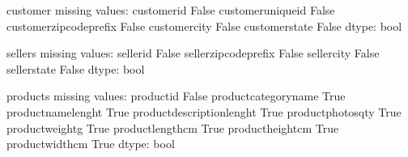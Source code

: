 \documentclass[letterpaper,10pt,english]{jupyterBook}
\begin{document}
\begin{sphinxVerbatim}[commandchars=\\\{\}]
customer missing values: 
customer\PYGZus{}id                 False
customer\PYGZus{}unique\PYGZus{}id          False
customer\PYGZus{}zip\PYGZus{}code\PYGZus{}prefix    False
customer\PYGZus{}city               False
customer\PYGZus{}state              False
dtype: bool
\end{sphinxVerbatim}

\begin{sphinxVerbatim}[commandchars=\\\{\}]
\end{sphinxVerbatim}

\begin{sphinxVerbatim}[commandchars=\\\{\}]
sellers missing values: 
seller\PYGZus{}id                 False
seller\PYGZus{}zip\PYGZus{}code\PYGZus{}prefix    False
seller\PYGZus{}city               False
seller\PYGZus{}state              False
dtype: bool
\end{sphinxVerbatim}

\begin{sphinxVerbatim}[commandchars=\\\{\}]
\end{sphinxVerbatim}

\begin{sphinxVerbatim}[commandchars=\\\{\}]
products missing values: 
product\PYGZus{}id                    False
product\PYGZus{}category\PYGZus{}name          True
product\PYGZus{}name\PYGZus{}lenght            True
product\PYGZus{}description\PYGZus{}lenght     True
product\PYGZus{}photos\PYGZus{}qty             True
product\PYGZus{}weight\PYGZus{}g               True
product\PYGZus{}length\PYGZus{}cm              True
product\PYGZus{}height\PYGZus{}cm              True
product\PYGZus{}width\PYGZus{}cm               True
dtype: bool
\end{sphinxVerbatim}
\end{document}
